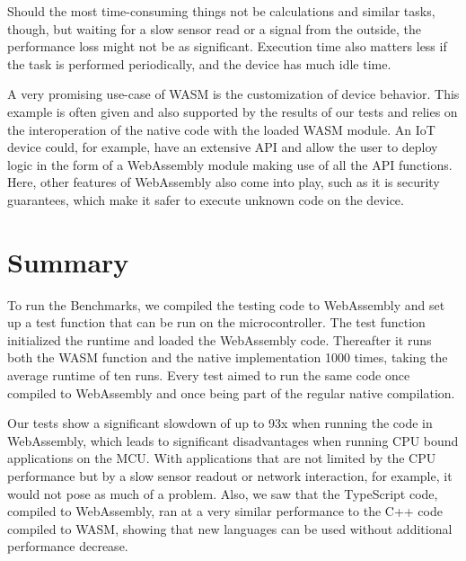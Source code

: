 Should the most time-consuming things not be calculations and similar tasks, though, but waiting for a slow sensor read or a signal from the outside, the performance loss might not be as significant. Execution time also matters less if the task is performed periodically, and the device has much idle time.

A very promising use-case of WASM is the customization of device behavior. This example is often given and also supported by the results of our tests and relies on the interoperation of the native code with the loaded WASM module. An IoT device could, for example, have an extensive API and allow the user to deploy logic in the form of a WebAssembly module making use of all the API functions. Here, other features of WebAssembly also come into play, such as it is security guarantees, which make it safer to execute unknown code on the device.

\section{Summary}

To run the Benchmarks, we compiled the testing code to WebAssembly and set up a test function that can be run on the microcontroller. The test function initialized the runtime and loaded the WebAssembly code. Thereafter it runs both the WASM function and the native implementation 1000 times, taking the average runtime of ten runs. Every test aimed to run the same code once compiled to WebAssembly and once being part of the regular native compilation.

Our tests show a significant slowdown of up to 93x when running the code in WebAssembly, which leads to significant disadvantages when running CPU bound applications on the MCU. With applications that are not limited by the CPU performance but by a slow sensor readout or network interaction, for example, it would not pose as much of a problem. Also, we saw that the TypeScript code, compiled to WebAssembly, ran at a very similar performance to the C++ code compiled to WASM, showing that new languages can be used without additional performance decrease.